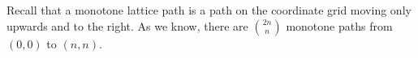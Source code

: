 

\setcounter{section}{4}
\setcounter{subsection}{5}
\setcounter{dfn}{6}

Recall that a monotone lattice path is a path on the coordinate grid moving only upwards and to the right.
As we know, there are $\binom{2n}{n}$ monotone paths from $(0,0)$ to $(n,n)$.



